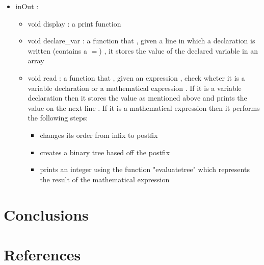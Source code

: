 \documentclass{article}
\begin{document}
\begin{itemize}
\begin{itemize}
	\end{itemize}
	\item inOut : 
	\begin{itemize}
		\item void display : a print function
		\item void declare\_var : a function that , given a line in which a declaration is written (contains a $=$) , it stores the value of the declared variable in an array
		\item void read : a function that , given an expression , check wheter it is a variable declaration or a mathematical expression . If it is a variable declaration then it stores the value as mentioned above and prints the value on the next line . If it is a mathematical expression then it performs the following steps:
		\begin{itemize}
			\item changes its order from infix to postfix
			\item creates a binary tree based off the postfix
			\item prints an integer using the function "evaluatetree" which represents the result of the mathematical expression
		\end{itemize}
	\end{itemize}
\end{itemize}
\section{Conclusions}

\section{References}



	
\end{document}
